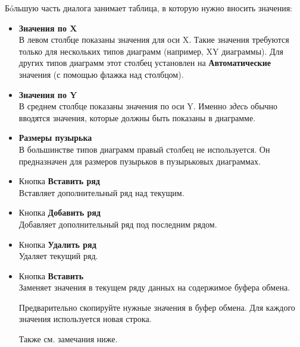 ﻿\documentclass[a4paper,10pt]{article}
\begin{document}
Б\'{o}льшую часть диалога занимает таблица, в которую нужно вносить значения:
\begin{itemize}
 \item \textbf{Значения по X}\\
 В левом столбце показаны значения для оси X. Такие значения требуются только для нескольких типов диаграмм (например, XY диаграммы). Для других типов диаграмм этот столбец установлен на \textbf{Автоматические} значения (с помощью флажка над столбцом).
 \item \textbf{Значения по Y}\\
 В среднем столбце показаны значения по оси Y. Именно \textit{здесь} обычно вводятся значения, которые должны быть показаны в диаграмме.
 \item \textbf{Размеры пузырька}\\
 В большинстве типов диаграмм правый столбец не используется. Он предназначен для размеров пузырьков в пузырьковых диаграммах.
 \item Кнопка \textbf{Вставить ряд}\\
 Вставляет дополнительный ряд над текущим.
 \item Кнопка \textbf{Добавить ряд}\\
 Добавляет дополнительный ряд под последним рядом.
 \item Кнопка \textbf{Удалить ряд}\\
 Удаляет текущий ряд.
 \item Кнопка \textbf{Вставить}\\
 Заменяет значения в текущем ряду данных на содержимое буфера обмена.
 
 Предварительно скопируйте нужные значения в буфер обмена. Для каждого значения используется новая строка.
 
 Также см. замечания ниже.
\end{itemize}
\end{document}
